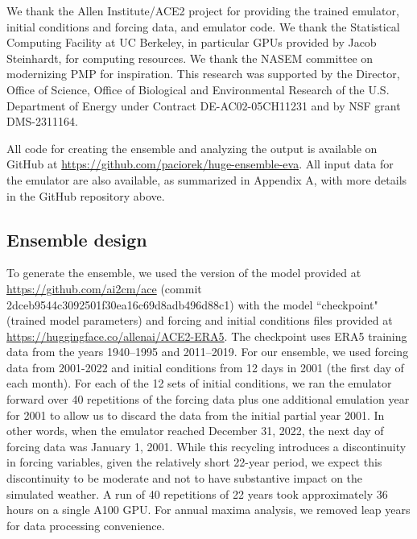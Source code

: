 \documentclass{ametsocV6.1}
\begin{document}
\clearpage
\acknowledgments
We thank the Allen Institute/ACE2 project for providing the trained emulator, initial conditions and forcing data, and emulator code. We thank the Statistical Computing Facility at UC Berkeley, in particular GPUs provided by Jacob Steinhardt, for computing resources. We thank the  NASEM committee on modernizing PMP for inspiration. This research was supported by the Director, Office of Science, Office of Biological and Environmental Research of the U.S. Department of Energy under Contract DE-AC02-05CH11231 and by NSF grant DMS-2311164.

\datastatement
All code for creating the ensemble and analyzing the output is available on GitHub at \url{https://github.com/paciorek/huge-ensemble-eva}.
All input data for the emulator are also available, as summarized in Appendix A, with more details in the GitHub repository above.



    
\clearpage
\appendix[A] 
\label{app-methods}

\subsection*{Ensemble design}
\label{app:design}


To generate the ensemble, we used the version of the model provided at \url{https://github.com/ai2cm/ace} (commit 2dceb9544c3092501f30ea16c69d8adb496d88c1) with the model ``checkpoint" (trained model parameters) and forcing and initial conditions files provided at \url{https://huggingface.co/allenai/ACE2-ERA5}. The checkpoint uses ERA5 training data from the years 1940–1995 and 2011–2019. For our ensemble, we used forcing data from 2001-2022 and initial conditions from 12 days in 2001 (the first day of each month). For each of the 12 sets of initial conditions, we ran the emulator forward over 40 repetitions of the forcing data plus one additional emulation year for 2001 to allow us to discard the data from the initial partial year 2001. In other words, when the emulator reached December 31, 2022, the next day of forcing data was January 1, 2001. While this recycling introduces a discontinuity in forcing variables, given the relatively short 22-year period, we expect this discontinuity to be moderate and not to have substantive impact on the simulated weather. A run of 40 repetitions of 22 years took approximately 36 hours on a single A100 GPU.  For annual maxima analysis, we removed leap years for data processing convenience.
\end{document}

